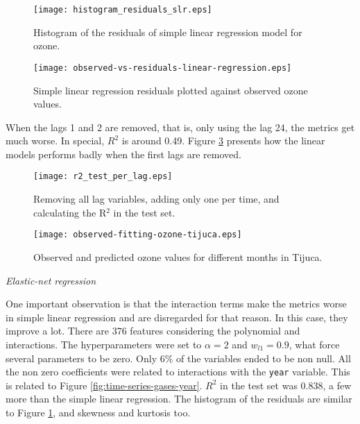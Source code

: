 \begin{figure}
    \centering
    \texttt{[image: histogram\_residuals\_slr.eps]}
    \caption{Histogram of the residuals of simple linear regression model for ozone.}
    \label{fig:histogram-residuals-slr}
\end{figure}

\begin{figure}[!ht]
    \centering
    \texttt{[image: observed-vs-residuals-linear-regression.eps]}
    \caption{Simple linear regression residuals plotted against
    observed ozone values.}
    \label{fig:observed-vs-residual-linear-regression}
\end{figure}

When the lags 1 and 2 are removed, that is, only using the lag 24, the metrics
get much worse. In special, $R^2$ is around 0.49. Figure \ref{fig:r2-test-lag}
presents how the linear models performs badly when the first lags are removed.

\begin{figure}[!ht]
    \centering
    \texttt{[image: r2\_test\_per\_lag.eps]}
    \caption{Removing all lag variables, adding only one per time, and calculating the R$^2$ in the test set.}
    \label{fig:r2-test-lag}
\end{figure}

\begin{figure*}[!ht]
    \centering
    \texttt{[image: observed-fitting-ozone-tijuca.eps]}
    \caption{Observed and predicted ozone values for different months in Tijuca.}
    \label{fig:observed-fitting-ozone-tijuca}
\end{figure*}

\vspace{2mm}

{\em Elastic-net regression}

\vspace{2mm}

One important observation is that the interaction terms make the metrics worse
in simple linear regression and are disregarded for that reason. In this
case, they improve a lot. There are 376 features considering the polynomial
and interactions. The hyperparameters were set to $\alpha = 2$ and
$w_{l1} = 0.9$, what force several parameters to be zero. Only 6\% of the
variables ended to be non null. All the non zero coefficients were related to interactions with the {\tt year} variable.
This is related to Figure \ref{fig:time-series-gases-year}. $R^2$ in the test
set was 0.838, a few more than the simple linear regression. The histogram of
the residuals are similar to Figure \ref{fig:histogram-residuals-slr}, and
skewness and kurtosis too.

